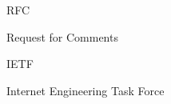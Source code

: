\documentclass[main.tex]{subfiles}
\begin{document}
\begin{flashcard}{RFC}
    \begin{center}
        Request for Comments
    \end{center}
\end{flashcard}

\begin{flashcard}{IETF}
    \begin{center}
        Internet Engineering Task Force
    \end{center}
\end{flashcard}
\end{document}
